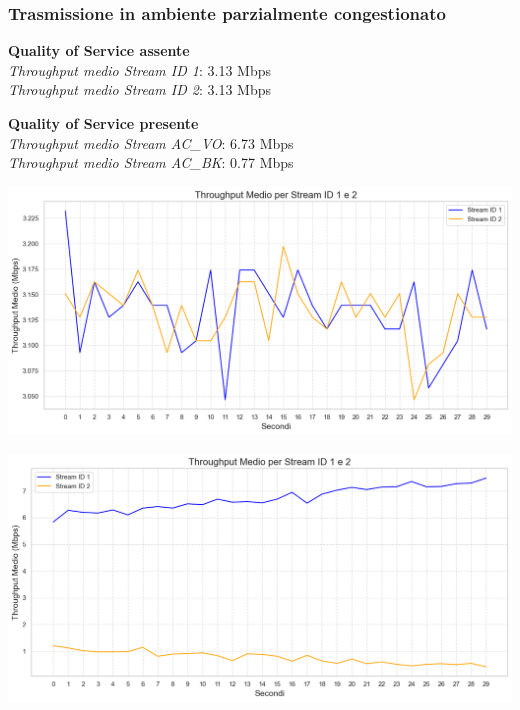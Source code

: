 \documentclass{beamer}
\begin{document}
\begin{frame}
    \frametitle{Trasmissione in ambiente parzialmente congestionato}
    
    \begin{minipage}{0.45\textwidth}
        \textbf{Quality of Service assente}\\
        \textit{Throughput medio Stream ID 1}: 3.13 Mbps\\
        \textit{Throughput medio Stream ID 2}: 3.13 Mbps\\
        
        \vspace{1cm}
        
        \textbf{Quality of Service presente}\\
        \textit{Throughput medio Stream AC\_VO}: 6.73 Mbps\\
        \textit{Throughput medio Stream AC\_BK}: 0.77 Mbps\\
    \end{minipage}
    \hfill
    \begin{minipage}{0.5\textwidth}
        \centering
        \begin{minipage}{\textwidth}
            \includegraphics[width=\textwidth]{t1_c1_main.png}
            \vspace{0.5cm}
        \end{minipage}
        \begin{minipage}{\textwidth}
            \includegraphics[width=\textwidth]{t2_c1_main.png}
        \end{minipage}
    \end{minipage}

\end{frame}
\end{document}
